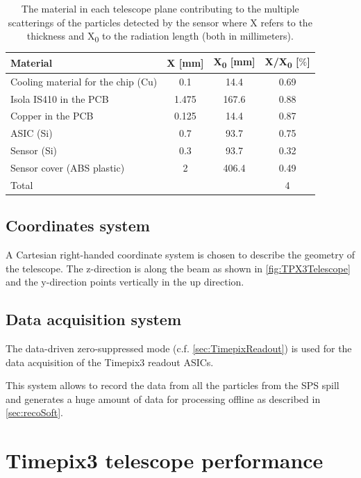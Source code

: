 \begin{table}[htbp]
  \centering
  \caption{The material in each telescope plane contributing to the
    multiple scatterings of the particles detected by the sensor where
    X refers to the thickness and X\textsubscript{0} to the radiation
    length (both in millimeters).}
  \label{tab:TPX3TelescopeMaterial}
  \begin{tabular}{l c c c}
    \toprule
    Material & X [mm] & X\textsubscript{0} [mm] & X/X\textsubscript{0} [$\%$] \\
    \midrule
    Cooling material for the chip (Cu) & 0.1 & 14.4 & 0.69 \\
    Isola IS410 in the PCB & 1.475 & 167.6 & 0.88 \\
    Copper in the PCB & 0.125 & 14.4 & 0.87 \\
    ASIC (Si) & 0.7 & 93.7 & 0.75\\
    Sensor (Si) & 0.3 & 93.7 & 0.32\\ 
    Sensor cover (ABS plastic) & 2 & 406.4 & 0.49 \\ \hline
    Total & & & 4 \\
    \bottomrule
  \end{tabular}
\end{table}

\subsection{Coordinates system}
A Cartesian right-handed coordinate system is chosen to describe the
geometry of the telescope. The z-direction is along the beam as shown
in \cref{fig:TPX3Telescope} and the y-direction points vertically in
the up direction.

\subsection{Data acquisition system}
The data-driven zero-suppressed mode (c.f. \cref{sec:TimepixReadout})
is used for the data acquisition of the Timepix3 readout ASICs. 

This system allows to record the data from all the particles from the
SPS spill and generates a huge amount of data for processing offline
as described in \cref{sec:recoSoft}.


\section{Timepix3 telescope performance}\label{sec:telescopePerformance}

